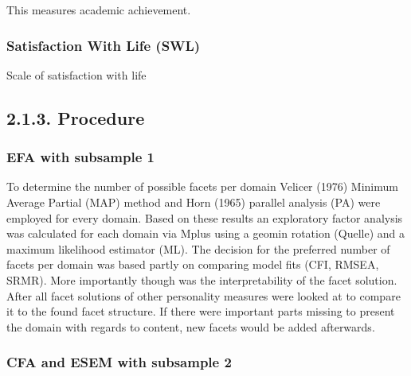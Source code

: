 \documentclass[man]{apa6}
\theoremstyle{definition}
\theoremstyle{definition}
\theoremstyle{definition}
\theoremstyle{remark}
\begin{document}
This measures academic achievement.

\hypertarget{satisfaction-with-life-swl}{%
\subsubsection{Satisfaction With Life
(SWL)}\label{satisfaction-with-life-swl}}

Scale of satisfaction with life

\hypertarget{procedure}{%
\subsection{2.1.3. Procedure}\label{procedure}}

\hypertarget{efa-with-subsample-1}{%
\subsubsection{EFA with subsample 1}\label{efa-with-subsample-1}}

To determine the number of possible facets per domain Velicer (1976)
Minimum Average Partial (MAP) method and Horn (1965) parallel analysis
(PA) were employed for every domain. Based on these results an
exploratory factor analysis was calculated for each domain via Mplus
using a geomin rotation (Quelle) and a maximum likelihood estimator
(ML). The decision for the preferred number of facets per domain was
based partly on comparing model fits (CFI, RMSEA, SRMR). More
importantly though was the interpretability of the facet solution. After
all facet solutions of other personality measures were looked at to
compare it to the found facet structure. If there were important parts
missing to present the domain with regards to content, new facets would
be added afterwards.

\hypertarget{cfa-and-esem-with-subsample-2}{%
\subsubsection{CFA and ESEM with subsample
2}\label{cfa-and-esem-with-subsample-2}}
\end{document}
